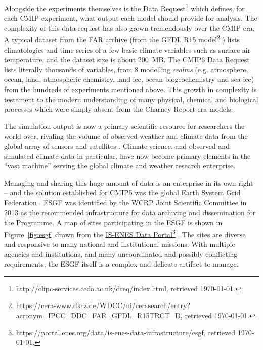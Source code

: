\documentclass[gmd,manuscript]{copernicus}
\begin{document}
Alongside the experiments themselves is the
\href{http://clipc-services.ceda.ac.uk/dreq/index.html}{Data
  Request}\footnote{http://clipc-services.ceda.ac.uk/dreq/index.html,
  retrieved \today.} which defines, for each CMIP experiment, what
output each model should provide for analysis. The complexity of this
data request has also grown tremendously over the CMIP era. A typical
dataset from the FAR archive
(\href{https://cera-www.dkrz.de/WDCC/ui/cerasearch/entry?acronym=IPCC_DDC_FAR_GFDL_R15TRCT_D}{from
  the GFDL R15
  model}\footnote{https://cera-www.dkrz.de/WDCC/ui/cerasearch/entry?acronym=IPCC\_DDC\_FAR\_GFDL\_R15TRCT\_D,
  retrieved \today.} ) lists climatologies and time series of a few
basic climate variables such as surface air temperature, and the
dataset size is about 200~MB. The CMIP6 Data Request
\cite{ref:juckesetal2015} lists literally thousands of variables, from
8 modelling \emph{realms} (e.g. atmosphere, ocean, land, atmospheric
chemistry, land ice, ocean biogeochemistry and sea ice) from the
hundreds of experiments mentioned above. This growth in complexity is
testament to the modern understanding of many physical, chemical and
biological processes which were simply absent from the Charney
Report-era models.

The simulation output is now a primary scientific resource for
researchers the world over, rivaling the volume of observed weather
and climate data from the global array of sensors and satellites
\citep{ref:overpecketal2011}. Climate science, and observed and
simulated climate data in particular, have now become primary elements
in the ``vast machine'' \citep{ref:edwards2010} serving the global
climate and weather research enterprise.

Managing and sharing this huge amount of data is an enterprise in its
own right -- and the solution established for CMIP5 was the global
Earth System Grid Federation
\citep[ESGF,][]{ref:williamsetal2011a,ref:williamsetal2015}. ESGF was
identified by the WCRP Joint Scientific Committee in 2013 as the
recommended infrastructure for data archiving and dissemination for
the Programme. A map of sites participating in the ESGF is shown in
Figure~\ref{fig:esgf} drawn from the
\href{https://portal.enes.org/data/is-enes-data-infrastructure/esgf}{IS-ENES
  Data
  Portal}\footnote{https://portal.enes.org/data/is-enes-data-infrastructure/esgf,
  retrieved \today.} . The sites are diverse and responsive to many
national and institutional missions. With multiple agencies and
institutions, and many uncoordinated and possibly conflicting
requirements, the ESGF itself is a complex and delicate artifact to
manage.
\end{document}
